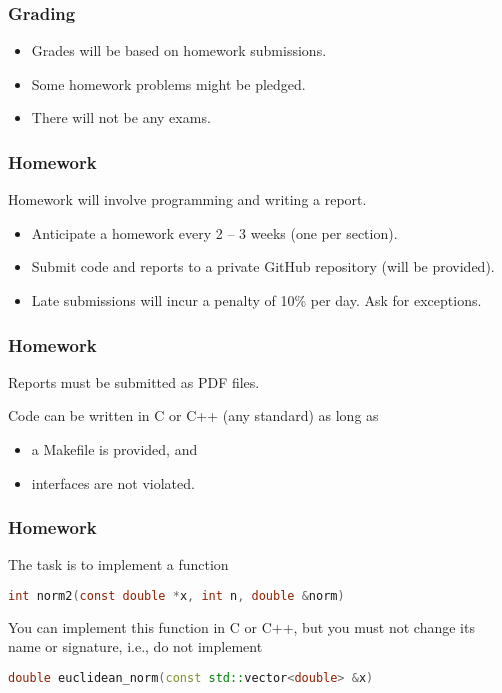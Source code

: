 \documentclass[12pt,t]{beamer}
\let\emph\relax %
\begin{document}
  \begin{frame}
    \frametitle{Grading}

    \begin{itemize}
      \item Grades will be based on homework submissions.
      \item Some homework problems might be pledged.
      \item There will not be any exams.
    \end{itemize}
  \end{frame}

  \begin{frame}
    \frametitle{Homework}

    Homework will involve programming and writing a report.
    \begin{itemize}
      \item Anticipate a homework every 2 -- 3 weeks (one per section).
      \item Submit code and reports to a private GitHub repository (will be provided).
      \item Late submissions will incur a penalty of 10\% per day. Ask \emph{in advance} for exceptions.
    \end{itemize}
  \end{frame}

  \begin{frame}
    \frametitle{Homework}

    Reports must be submitted as PDF files.

    Code can be written in C or C++ (any standard) as long as
    \begin{itemize}
      \item a Makefile is provided, and
      \item interfaces are not violated.
    \end{itemize}
  \end{frame}

  \begin{frame}[fragile]
    \frametitle{Homework}

    \emph{Example 1:} The task is to implement a function
    \begin{lstlisting}[language=c]
      int norm2(const double *x, int n, double &norm)
    \end{lstlisting}

    You can implement this function in C or C++, but you must not change its name or signature, i.e., do not implement
    \begin{lstlisting}[language=c++]
      double euclidean_norm(const std::vector<double> &x)
    \end{lstlisting}
  \end{frame}
\end{document}
